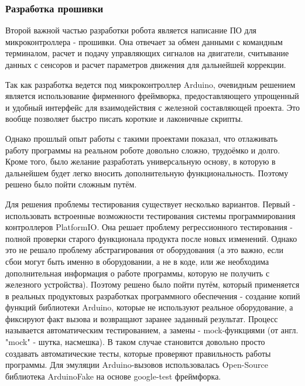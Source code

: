 \documentclass[14pt,a4paper,russian]{scrartcl}
\begin{document}
\subsubsection{Разработка прошивки}
Второй важной частью разработки робота является написание ПО для микроконтроллера 
- прошивки. Она отвечает за обмен данными с командным терминалом,
расчет и подачу управляющих сигналов на двигатели, считывание данных
с сенсоров и расчет параметров движения для дальнейшей коррекции.

Так как разработка ведется под микроконтроллер Arduino, очевидным
решением является использование фирменного фреймворка, 
предоставляющего упрощенный и удобный интерфейс для взаимодействия
с железной составляющей проекта. Это вообще позволяет быстро писать 
короткие и лаконичные скрипты.

Однако прошлый опыт работы с такими проектами показал, что отлаживать 
работу программы на реальном роботе довольно сложно, трудоёмко и долго.
Кроме того, было желание разработать универсальную основу, в которую
в дальнейшем будет легко вносить дополнительную функциональность. Поэтому
решено было пойти сложным путём.

Для решения проблемы тестирования существует несколько вариантов. 
Первый - использовать встроенные возможности тестирования системы
программирования контроллеров PlatformIO. Она решает проблему регрессионного
тестирования - полной проверки старого функционала продукта после новых изменений.
Однако это не решало проблему абстрагирования от оборудования (а это важно, если
сбои могут быть именно в оборудовании, а не в коде, или же необходима
дополнительная информация о работе программы, которую не получить с железного
устройства). Поэтому решено было пойти путём, который применяется в реальных
продуктовых разработках программного обеспечения - создание копий функций
библиотеки Arduino, которые не используют реальное оборудование, а 
фиксируют факт вызова и возвращают заранее заданный результат. Процесс называется
автоматическим тестированием, а замены - mock-функциями (от англ. "mock" - шутка, насмешка).
В таком случае становится довольно просто создавать автоматические тесты,
которые проверяют правильность работы программы. Для эмуляции Arduino-вызовов
использовалась Open-Source библиотека ArduinoFake на основе google-test фреймфорка.
\end{document}
